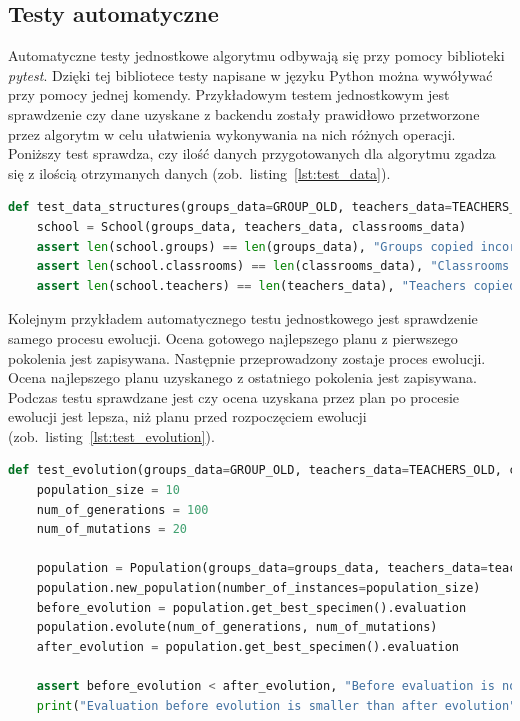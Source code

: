	\subsection{Testy automatyczne}	
	Automatyczne testy jednostkowe algorytmu odbywają się przy pomocy biblioteki \textit{pytest}. Dzięki tej bibliotece testy napisane w języku Python można wywóływać przy pomocy jednej komendy. Przykładowym testem jednostkowym jest sprawdzenie czy dane uzyskane z backendu zostały prawidłowo przetworzone przez algorytm w celu ułatwienia wykonywania na nich różnych operacji. Poniższy test sprawdza, czy ilość danych przygotowanych dla algorytmu zgadza się z ilością otrzymanych danych (zob.~listing~\ref{lst:test_data}).
	\begin{lstlisting}[language=Python, caption=Implementacja przykładowego testu jednostkowego sprawdzającego spójność danych, label={lst:test_data}]
	def test_data_structures(groups_data=GROUP_OLD, teachers_data=TEACHERS_OLD, classrooms_data=CLASSES_OLD):
    school = School(groups_data, teachers_data, classrooms_data)
    assert len(school.groups) == len(groups_data), "Groups copied incorrectly to dict of class Group"
    assert len(school.classrooms) == len(classrooms_data), "Classrooms copied incorrectly to dict of class Classroom"
    assert len(school.teachers) == len(teachers_data), "Teachers copied incorrectly to dict of class Teacher"
\end{lstlisting}
	
	Kolejnym przykładem automatycznego testu jednostkowego jest sprawdzenie samego procesu ewolucji. Ocena gotowego najlepszego planu z pierwszego pokolenia jest zapisywana. Następnie przeprowadzony zostaje proces ewolucji. Ocena najlepszego planu uzyskanego z ostatniego pokolenia jest zapisywana. Podczas testu sprawdzane jest czy ocena uzyskana przez plan po procesie ewolucji jest lepsza, niż planu przed rozpoczęciem ewolucji (zob.~listing~\ref{lst:test_evolution}).
	
	\begin{lstlisting}[language=Python, caption=Implementacja przykładowego testu jednostkowego sprawdzającego proces ewolucji, label={lst:test_evolution}]
	def test_evolution(groups_data=GROUP_OLD, teachers_data=TEACHERS_OLD, classrooms_data=CLASSES_OLD):
    population_size = 10
    num_of_generations = 100
    num_of_mutations = 20

    population = Population(groups_data=groups_data, teachers_data=teachers_data, classrooms_data=classrooms_data)
    population.new_population(number_of_instances=population_size)
    before_evolution = population.get_best_specimen().evaluation
    population.evolute(num_of_generations, num_of_mutations)
    after_evolution = population.get_best_specimen().evaluation

    assert before_evolution < after_evolution, "Before evaluation is not smaller than after evaluation"
    print("Evaluation before evolution is smaller than after evolution")
\end{lstlisting}


